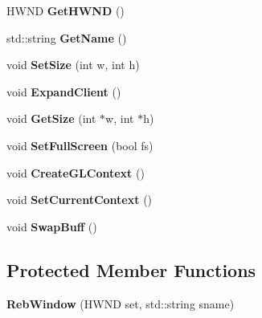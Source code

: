 \begin{DoxyCompactItemize}
\item 
H\+W\+ND {\bfseries Get\+H\+W\+ND} ()\hypertarget{class_reb_window_a820a8d2361711f0fb41fe925eb4a8923}{}\label{class_reb_window_a820a8d2361711f0fb41fe925eb4a8923}

\item 
std\+::string {\bfseries Get\+Name} ()\hypertarget{class_reb_window_a7938f018612b41acfcc9fab99668b725}{}\label{class_reb_window_a7938f018612b41acfcc9fab99668b725}

\item 
void {\bfseries Set\+Size} (int w, int h)\hypertarget{class_reb_window_a7408780ef66080d4f6416d49da1366fb}{}\label{class_reb_window_a7408780ef66080d4f6416d49da1366fb}

\item 
void {\bfseries Expand\+Client} ()\hypertarget{class_reb_window_a5e444e489b9c95971ffa9c8c9ef3f537}{}\label{class_reb_window_a5e444e489b9c95971ffa9c8c9ef3f537}

\item 
void {\bfseries Get\+Size} (int $\ast$w, int $\ast$h)\hypertarget{class_reb_window_ababbeab798c81aabac23b4733adaa23d}{}\label{class_reb_window_ababbeab798c81aabac23b4733adaa23d}

\item 
void {\bfseries Set\+Full\+Screen} (bool fs)\hypertarget{class_reb_window_a539d2cc52f892d4a825a392c258b9cde}{}\label{class_reb_window_a539d2cc52f892d4a825a392c258b9cde}

\item 
void {\bfseries Create\+G\+L\+Context} ()\hypertarget{class_reb_window_a4208325b114fcf6e07875646e933db2f}{}\label{class_reb_window_a4208325b114fcf6e07875646e933db2f}

\item 
void {\bfseries Set\+Current\+Context} ()\hypertarget{class_reb_window_af8fd4ff256f82125ee634b55bfe31061}{}\label{class_reb_window_af8fd4ff256f82125ee634b55bfe31061}

\item 
void {\bfseries Swap\+Buff} ()\hypertarget{class_reb_window_a9b012e524fa03c6f83b4aaf7fb14eeb5}{}\label{class_reb_window_a9b012e524fa03c6f83b4aaf7fb14eeb5}

\end{DoxyCompactItemize}
\subsection*{Protected Member Functions}
\begin{DoxyCompactItemize}
\item 
{\bfseries Reb\+Window} (H\+W\+ND set, std\+::string sname)\hypertarget{class_reb_window_a2b44176af9877656bce1e07c2772b0eb}{}\label{class_reb_window_a2b44176af9877656bce1e07c2772b0eb}

\end{DoxyCompactItemize}
